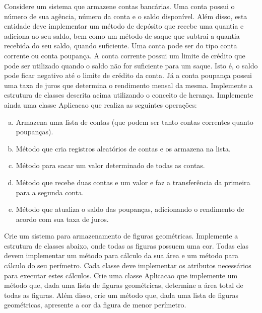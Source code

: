 \begin{exercise}[ContasBancarias]
Considere um sistema que armazene contas bancárias. Uma conta possui o número de sua agência, número da conta e o saldo disponível. Além disso, esta entidade deve implementar um método de depósito que recebe uma quantia e adiciona ao seu saldo, bem como um método de saque que subtrai a quantia recebida do seu saldo, quando suficiente. Uma conta pode ser do tipo conta corrente ou conta poupança. A conta corrente possui um limite de crédito que pode ser utilizado quando o saldo não for suficiente para um saque. Isto é, o saldo pode ficar negativo até o limite de crédito da conta. Já a conta poupança possui uma taxa de juros que determina o rendimento mensal da mesma. Implemente a estrutura de classes descrita acima utilizando o conceito de herança. Implemente ainda uma classe Aplicacao que realiza as seguintes operações:

\begin{enumerate}[a)]
	\item Armazena uma lista de contas (que podem ser tanto contas correntes quanto poupanças).
	\item Método que cria registros aleatórios de contas e os armazena na lista.
	\item Método para sacar um valor determinado de todas as contas.
	\item Método que recebe duas contas e um valor e faz a transferência da primeira para a segunda conta.
	\item Método que atualiza o saldo das poupanças, adicionando o rendimento de acordo com sua taxa de juros.
\end{enumerate}

\end{exercise}

\begin{exercise}[FigurasGeometricas]
Crie um sistema para armazenamento de figuras geométricas. Implemente a estrutura de classes abaixo, onde todas as figuras possuem uma cor. Todas elas devem implementar um método para cálculo da sua área e um método para cálculo do seu perímetro. Cada classe deve implementar os atributos necessários para executar estes cálculos. Crie uma classe Aplicacao que implemente um método que, dada uma lista de figuras geométricas, determine a área total de todas as figuras. Além disso, crie um método que, dada uma lista de figuras geométricas, apresente a cor da figura de menor perímetro.

\begin{figure}[h]
	\centering
\end{figure}

\end{exercise}

